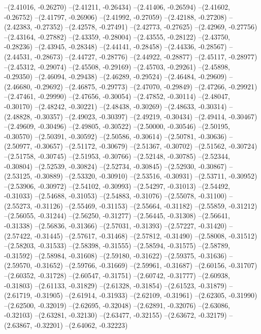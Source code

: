 --(2.41016, -0.26270)
--(2.41211, -0.26434)
--(2.41406, -0.26594)
--(2.41602, -0.26752)
--(2.41797, -0.26906)
--(2.41992, -0.27059)
--(2.42188, -0.27208)
--(2.42383, -0.27352)
--(2.42578, -0.27491)
--(2.42773, -0.27625)
--(2.42969, -0.27756)
--(2.43164, -0.27882)
--(2.43359, -0.28004)
--(2.43555, -0.28122)
--(2.43750, -0.28236)
--(2.43945, -0.28348)
--(2.44141, -0.28458)
--(2.44336, -0.28567)
--(2.44531, -0.28673)
--(2.44727, -0.28776)
--(2.44922, -0.28877)
--(2.45117, -0.28977)
--(2.45312, -0.29074)
--(2.45508, -0.29169)
--(2.45703, -0.29261)
--(2.45898, -0.29350)
--(2.46094, -0.29438)
--(2.46289, -0.29524)
--(2.46484, -0.29609)
--(2.46680, -0.29692)
--(2.46875, -0.29773)
--(2.47070, -0.29849)
--(2.47266, -0.29921)
--(2.47461, -0.29990)
--(2.47656, -0.30054)
--(2.47852, -0.30114)
--(2.48047, -0.30170)
--(2.48242, -0.30221)
--(2.48438, -0.30269)
--(2.48633, -0.30314)
--(2.48828, -0.30357)
--(2.49023, -0.30397)
--(2.49219, -0.30434)
--(2.49414, -0.30467)
--(2.49609, -0.30496)
--(2.49805, -0.30522)
--(2.50000, -0.30546)
--(2.50195, -0.30570)
--(2.50391, -0.30592)
--(2.50586, -0.30614)
--(2.50781, -0.30636)
--(2.50977, -0.30657)
--(2.51172, -0.30679)
--(2.51367, -0.30702)
--(2.51562, -0.30724)
--(2.51758, -0.30745)
--(2.51953, -0.30766)
--(2.52148, -0.30785)
--(2.52344, -0.30804)
--(2.52539, -0.30824)
--(2.52734, -0.30845)
--(2.52930, -0.30867)
--(2.53125, -0.30889)
--(2.53320, -0.30910)
--(2.53516, -0.30931)
--(2.53711, -0.30952)
--(2.53906, -0.30972)
--(2.54102, -0.30993)
--(2.54297, -0.31013)
--(2.54492, -0.31033)
--(2.54688, -0.31053)
--(2.54883, -0.31076)
--(2.55078, -0.31100)
--(2.55273, -0.31126)
--(2.55469, -0.31153)
--(2.55664, -0.31182)
--(2.55859, -0.31212)
--(2.56055, -0.31244)
--(2.56250, -0.31277)
--(2.56445, -0.31308)
--(2.56641, -0.31338)
--(2.56836, -0.31366)
--(2.57031, -0.31393)
--(2.57227, -0.31420)
--(2.57422, -0.31445)
--(2.57617, -0.31468)
--(2.57812, -0.31490)
--(2.58008, -0.31512)
--(2.58203, -0.31533)
--(2.58398, -0.31555)
--(2.58594, -0.31575)
--(2.58789, -0.31592)
--(2.58984, -0.31608)
--(2.59180, -0.31622)
--(2.59375, -0.31636)
--(2.59570, -0.31652)
--(2.59766, -0.31669)
--(2.59961, -0.31687)
--(2.60156, -0.31707)
--(2.60352, -0.31728)
--(2.60547, -0.31751)
--(2.60742, -0.31777)
--(2.60938, -0.31803)
--(2.61133, -0.31829)
--(2.61328, -0.31854)
--(2.61523, -0.31879)
--(2.61719, -0.31905)
--(2.61914, -0.31933)
--(2.62109, -0.31961)
--(2.62305, -0.31990)
--(2.62500, -0.32019)
--(2.62695, -0.32048)
--(2.62891, -0.32076)
--(2.63086, -0.32103)
--(2.63281, -0.32130)
--(2.63477, -0.32155)
--(2.63672, -0.32179)
--(2.63867, -0.32201)
--(2.64062, -0.32223)
